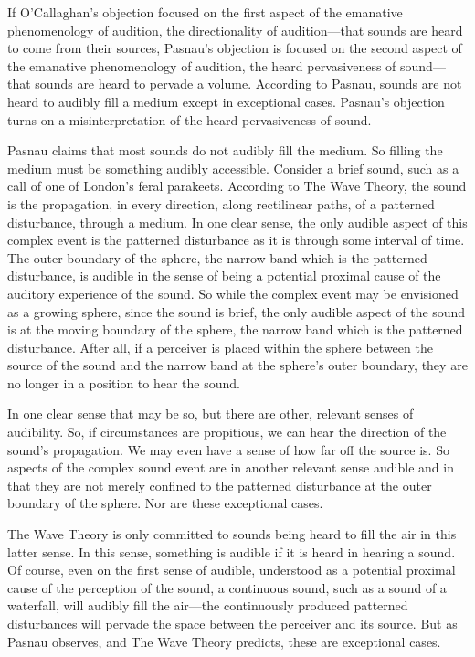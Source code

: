 \documentclass[12pt]{article}
\begin{document}
If O’Callaghan’s objection focused on the first aspect of the emanative phenomenology of audition, the directionality of audition---that sounds are heard to come from their sources, Pasnau’s objection is focused on the second aspect of the emanative phenomenology of audition, the heard pervasiveness of sound---that sounds are heard to pervade a volume. According to Pasnau, sounds are not heard to audibly fill a medium except in exceptional cases. Pasnau's objection turns on a misinterpretation of the heard pervasiveness of sound.

Pasnau claims that most sounds do not audibly fill the medium. So filling the medium must be something audibly accessible. Consider a brief sound, such as a call of one of London's feral parakeets. According to The Wave Theory, the sound is the propagation, in every direction, along rectilinear paths, of a patterned disturbance, through a medium. In one clear sense, the only audible aspect of this complex event is the patterned disturbance as it is through some interval of time. The outer boundary of the sphere, the narrow band which is the patterned disturbance, is audible in the sense of being a potential proximal cause of the auditory experience of the sound. So while the complex event may be envisioned as a growing sphere, since the sound is brief, the only audible aspect of the sound is at the moving boundary of the sphere, the narrow band which is the patterned disturbance. After all, if a perceiver is placed within the sphere between the source of the sound and the narrow band at the sphere's outer boundary, they are no longer in a position to hear the sound. 

In one clear sense that may be so, but there are other, relevant senses of audibility. So, if circumstances are propitious, we can hear the direction of the sound's propagation. We may even have a sense of how far off the source is. So aspects of the complex sound event are in another relevant sense audible and in that they are not merely confined to the patterned disturbance at the outer boundary of the sphere. Nor are these exceptional cases. 

The Wave Theory is only committed to sounds being heard to fill the air in this latter sense. In this sense, something is audible if it is heard in hearing a sound. Of course, even on the first sense of audible, understood as a potential proximal cause of the perception of the sound, a continuous sound, such as a sound of a waterfall, will audibly fill the air---the continuously produced patterned disturbances will pervade the space between the perceiver and its source. But as Pasnau observes, and The Wave Theory predicts, these are exceptional cases.
\end{document}
